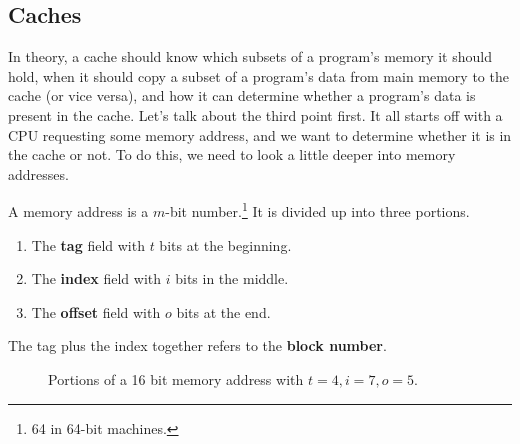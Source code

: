 \subsection{Caches}

  In theory, a cache should know which subsets of a program's memory it should hold, when it should copy a subset of a program's data from main memory to the cache (or vice versa), and how it can determine whether a program's data is present in the cache. Let's talk about the third point first. It all starts off with a CPU requesting some memory address, and we want to determine whether it is in the cache or not. To do this, we need to look a little deeper into memory addresses. 

  \begin{definition}
    \label{def:portions-of-memory-addresses}
    A memory address is a $m$-bit number.\footnote{64 in 64-bit machines.} It is divided up into three portions. 
    \begin{enumerate}
      \item The \textbf{tag} field with $t$ bits at the beginning.
      \item The \textbf{index} field with $i$ bits in the middle. 
      \item The \textbf{offset} field with $o$ bits at the end.
    \end{enumerate}
    The tag plus the index together refers to the \textbf{block number}. 
    \begin{figure}[H]
      \centering 
      \caption{Portions of a 16 bit memory address with $t = 4, i = 7, o = 5$. } 
      \label{fig:memory_portions}
    \end{figure}
  \end{definition}

